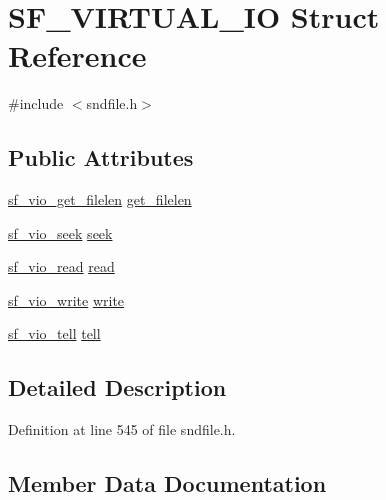 \hypertarget{struct_s_f___v_i_r_t_u_a_l___i_o}{}\section{S\+F\+\_\+\+V\+I\+R\+T\+U\+A\+L\+\_\+\+IO Struct Reference}
\label{struct_s_f___v_i_r_t_u_a_l___i_o}


{\ttfamily \#include $<$sndfile.\+h$>$}

\subsection*{Public Attributes}
\begin{DoxyCompactItemize}
\item 
\mbox{\hyperlink{sndfile_8h_a2166198457fe4e852ef10804b2c1e8a1}{sf\+\_\+vio\+\_\+get\+\_\+filelen}} \mbox{\hyperlink{struct_s_f___v_i_r_t_u_a_l___i_o_ab4ab3640c28c30b60059c2be2b734057}{get\+\_\+filelen}}
\item 
\mbox{\hyperlink{sndfile_8h_ad23e218718c16eae24b98d41976ac5d2}{sf\+\_\+vio\+\_\+seek}} \mbox{\hyperlink{struct_s_f___v_i_r_t_u_a_l___i_o_aa8ac1ef2302a43acca58a02e809a815f}{seek}}
\item 
\mbox{\hyperlink{sndfile_8h_a90c34518e3de9fbed3611b030e17dba7}{sf\+\_\+vio\+\_\+read}} \mbox{\hyperlink{struct_s_f___v_i_r_t_u_a_l___i_o_af5fbdef0ac173a604b2dff50f210982a}{read}}
\item 
\mbox{\hyperlink{sndfile_8h_aa1b1f82878422da550bfd70f2be3ded3}{sf\+\_\+vio\+\_\+write}} \mbox{\hyperlink{struct_s_f___v_i_r_t_u_a_l___i_o_ac99aed00fed47ac8817332e208a8cb4a}{write}}
\item 
\mbox{\hyperlink{sndfile_8h_a457595d4cdaf505525ff421aebe6eb5d}{sf\+\_\+vio\+\_\+tell}} \mbox{\hyperlink{struct_s_f___v_i_r_t_u_a_l___i_o_ac40bf7a24e909f0ebec62fab7c0321b2}{tell}}
\end{DoxyCompactItemize}


\subsection{Detailed Description}


Definition at line 545 of file sndfile.\+h.



\subsection{Member Data Documentation}
\mbox{\label{struct_s_f___v_i_r_t_u_a_l___i_o_ab4ab3640c28c30b60059c2be2b734057}} 
